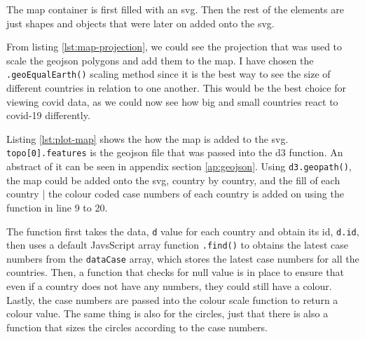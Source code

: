 \documentclass{scrreprt}
\begin{document}
The map container is first filled with an svg. Then the rest of the elements are just shapes and objects that were later on added onto the svg. 
\vspace{8pt}

From listing \ref{lst:map-projection}, we could see the projection that was used to scale the geojson polygons and add them to the map. I have chosen the \verb|.geoEqualEarth()| scaling method since it is the best way to see the size of different countries in relation to one another. This would be the best choice for viewing covid data, as we could now see how big and small countries react to covid-19 differently. 
\vspace{8pt}

Listing \ref{lst:plot-map} shows the how the map is added to the svg. \verb|topo[0].features| is the geojson file that was passed into the d3 function. An abstract of it can be seen in appendix section \ref{ap:geojson}. Using \verb|d3.geopath()|, the map could be added onto the svg, country by country, and the fill of each country | the colour coded case numbers of each country is added on using the function in line 9 to 20.
\par The function first takes the data, \verb|d| value for each country and obtain its id, \verb|d.id|, then uses a default JavsScript array function \verb|.find()| to obtains the latest case numbers from the \verb|dataCase| array, which stores the latest case numbers for all the countries. Then, a function that checks for null value is in place to ensure that even if a country does not have any numbers, they could still have a colour. Lastly, the case numbers are passed into the colour scale function to return a colour value. The same thing is also for the circles, just that there is also a function that sizes the circles according to the case numbers.
\end{document}
